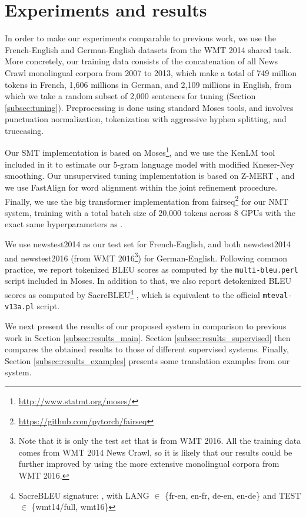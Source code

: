 \documentclass[11pt,a4paper]{article}
\begin{document}
\section{Experiments and results}
\label{sec:experiments}

In order to make our experiments comparable to previous work, we use the French-English and German-English datasets from the WMT 2014 shared task. More concretely, our training data consists of the concatenation of all News Crawl monolingual corpora from 2007 to 2013, which make a total of 749 million tokens in French, 1,606 millions in German, and 2,109 millions in English, from which we take a random subset of 2,000 sentences for tuning (Section \ref{subsec:tuning}). Preprocessing is done using standard Moses tools, and involves punctuation normalization, tokenization with aggressive hyphen splitting, and truecasing.

Our SMT implementation is based on Moses\footnote{\url{http://www.statmt.org/moses/}}, and we use the KenLM \citep{heafield2013scalable} tool included in it to estimate our 5-gram language model with modified Kneser-Ney smoothing. Our unsupervised tuning implementation is based on Z-MERT \citep{zaidan2009zmert}, and we use FastAlign \citep{dyer2013simple} for word alignment within the joint refinement procedure. Finally, we use the big transformer implementation from fairseq\footnote{\url{https://github.com/pytorch/fairseq}} for our NMT system, training with a total batch size of 20,000 tokens across 8 GPUs with the exact same hyperparameters as \citet{ott2018scaling}.

We use newstest2014 as our test set for French-English, and both newstest2014 and newstest2016 (from WMT 2016\footnote{Note that it is only the test set that is from WMT 2016. All the training data comes from WMT 2014 News Crawl, so it is likely that our results could be further improved by using the more extensive monolingual corpora from WMT 2016.}) for German-English. Following common practice, we report tokenized BLEU scores as computed by the \texttt{multi-bleu.perl} script included in Moses. In addition to that, we also report detokenized BLEU scores as computed by SacreBLEU\footnote{SacreBLEU signature: , with LANG $\in$ \{fr-en, en-fr, de-en, en-de\} and TEST $\in$ \{wmt14/full, wmt16\}} \citep{post2018call}, which is equivalent to the official \texttt{mteval-v13a.pl} script.

We next present the results of our proposed system in comparison to previous work in Section \ref{subsec:results_main}. Section \ref{subsec:results_supervised} then compares the obtained results to those of different supervised systems. Finally, Section \ref{subsec:results_examples} presents some translation examples from our system.
\end{document}
